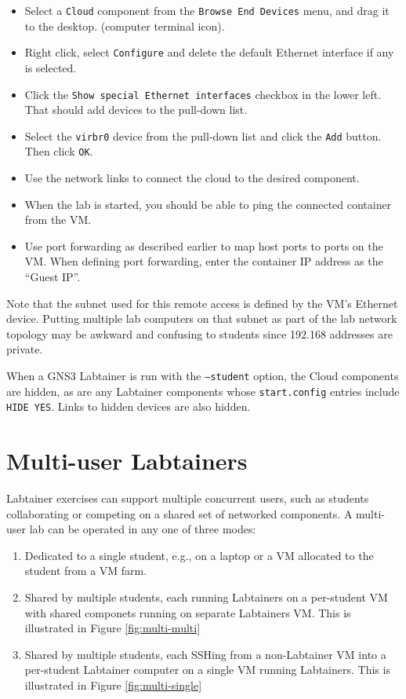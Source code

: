 \documentclass[12pt]{article}
\begin{document}
\begin{itemize}
\item Select a {\tt Cloud} component from the {\tt Browse End Devices} menu, and drag it to the desktop.  
(computer terminal icon).
\item Right click, select {\tt Configure} and delete the default Ethernet interface if any is selected.
\item Click the {\tt Show special Ethernet interfaces} checkbox in the lower left.  That should add devices to the pull-down
list.
\item Select the {\tt virbr0} device from the pull-down list and click the {\tt Add} button.  Then click {\tt OK}.
\item Use the network links to connect the cloud to the desired component.
\item When the lab is started, you should be able to ping the connected container from the VM.
\item Use port forwarding as described earlier to map host ports to ports on the VM.  When defining port forwarding, enter the
container IP address as the ``Guest IP''.
\end{itemize}
Note that the subnet used for this remote access is defined by the VM's Ethernet device.  Putting multiple lab computers
on that subnet as part of the lab network topology may be awkward and confusing to students since 192.168 addresses are
private.  

When a GNS3 Labtainer is run with the {\tt --student} option, the Cloud components are hidden, as are any Labtainer
components whose {\tt start.config} entries include {\tt HIDE YES}.  Links to hidden devices are also hidden.

\section {Multi-user Labtainers}
\label{multi user}
Labtainer exercises can support multiple concurrent users, such as students collaborating or competing on a shared 
set of networked components.  A multi-user lab can be operated in any one of three modes:
\begin{enumerate}
\item Dedicated to a single student, e.g., on a laptop or a VM allocated to the student from a VM farm.
\item Shared by multiple students, each running Labtainers on a per-student VM with shared componets running on separate
Labtainers VM.  This is illustrated in Figure \ref{fig:multi-multi}
\item Shared by multiple students, each SSHing from a non-Labtainer VM into a per-student Labtainer computer on a single
VM running Labtainers.  This is illustrated in Figure \ref{fig:multi-single}
\end{enumerate}
\end{document}
